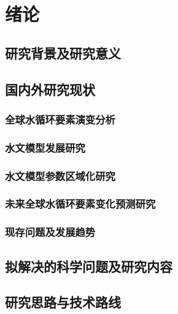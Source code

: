 \chapter{绪论}
\label{chap:introduction}

\section{研究背景及研究意义}

\section{国内外研究现状}

\subsection{全球水循环要素演变分析}

\subsection{水文模型发展研究}

\subsection{水文模型参数区域化研究}

\subsection{未来全球水循环要素变化预测研究}

\subsection{现存问题及发展趋势}

\section{拟解决的科学问题及研究内容}

\section{研究思路与技术路线}

\cleardoublepage
